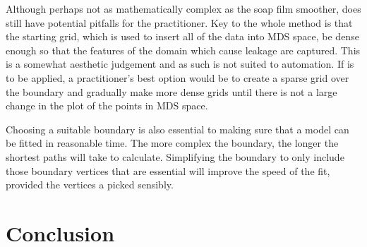 Although perhaps not as mathematically complex as the soap film smoother, \mdsap does still have potential pitfalls for the practitioner. Key to the whole method is that the starting grid, which is used to insert all of the data into MDS space, be dense enough so that the features of the domain which cause leakage are captured. This is a somewhat aesthetic judgement and as such is not suited to automation. If \mdsap is to be applied, a practitioner's best option would be to create a sparse grid over the boundary and gradually make more dense grids until there is not a large change in the plot of the points in MDS space.

Choosing a suitable boundary is also essential to making sure that a model can be fitted in reasonable time. The more complex the boundary, the longer the shortest paths will take to calculate. Simplifying the boundary to only include those boundary vertices that are essential will improve the speed of the fit, provided the vertices a picked sensibly.


\section{Conclusion}

